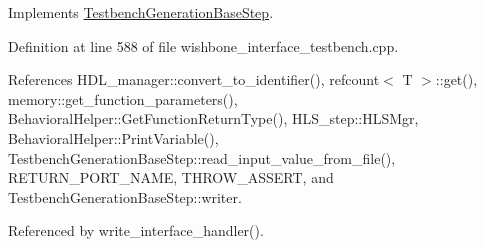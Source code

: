 Implements \hyperlink{classTestbenchGenerationBaseStep_abebc101901191b2ee6732df8c9ecc9ee}{Testbench\+Generation\+Base\+Step}.



Definition at line 588 of file wishbone\+\_\+interface\+\_\+testbench.\+cpp.



References H\+D\+L\+\_\+manager\+::convert\+\_\+to\+\_\+identifier(), refcount$<$ T $>$\+::get(), memory\+::get\+\_\+function\+\_\+parameters(), Behavioral\+Helper\+::\+Get\+Function\+Return\+Type(), H\+L\+S\+\_\+step\+::\+H\+L\+S\+Mgr, Behavioral\+Helper\+::\+Print\+Variable(), Testbench\+Generation\+Base\+Step\+::read\+\_\+input\+\_\+value\+\_\+from\+\_\+file(), R\+E\+T\+U\+R\+N\+\_\+\+P\+O\+R\+T\+\_\+\+N\+A\+ME, T\+H\+R\+O\+W\+\_\+\+A\+S\+S\+E\+RT, and Testbench\+Generation\+Base\+Step\+::writer.



Referenced by write\+\_\+interface\+\_\+handler().

